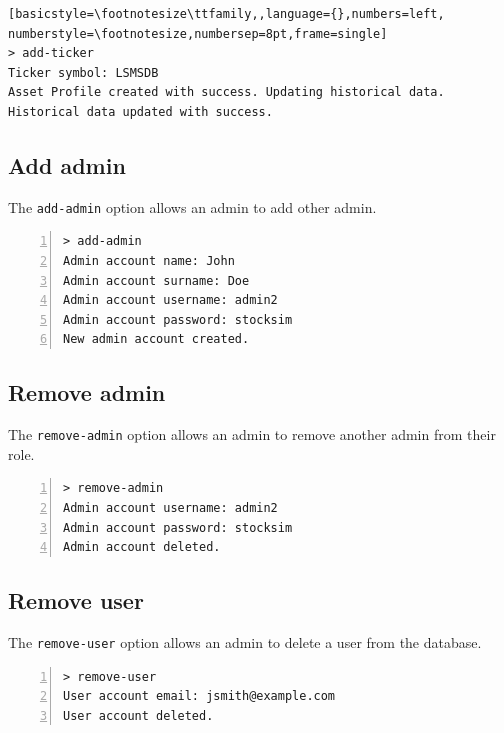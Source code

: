\begin{lstlisting}[basicstyle=\footnotesize\ttfamily,,language={},numbers=left,
numberstyle=\footnotesize,numbersep=8pt,frame=single]
> add-ticker
Ticker symbol: LSMSDB
Asset Profile created with success. Updating historical data.
Historical data updated with success.
\end{lstlisting}

\subsection{Add admin}
The \texttt{add-admin} option allows an admin to add other admin.
\begin{lstlisting}[basicstyle=\footnotesize\ttfamily,language={},numbers=left,
numberstyle=\footnotesize,numbersep=8pt,frame=single]
> add-admin
Admin account name: John
Admin account surname: Doe
Admin account username: admin2
Admin account password: stocksim
New admin account created.
\end{lstlisting}

\subsection{Remove admin}

The \texttt{remove-admin} option allows an admin to remove another admin from their role.

\begin{lstlisting}[basicstyle=\footnotesize\ttfamily,language={},numbers=left,
numberstyle=\footnotesize,numbersep=8pt,frame=single]
> remove-admin
Admin account username: admin2
Admin account password: stocksim
Admin account deleted.
\end{lstlisting}

\subsection{Remove user}
The \texttt{remove-user} option allows an admin to delete a user from the database.

\begin{lstlisting}[basicstyle=\footnotesize\ttfamily,language={},numbers=left,
numberstyle=\footnotesize,numbersep=8pt,frame=single]
> remove-user
User account email: jsmith@example.com
User account deleted.
\end{lstlisting}


